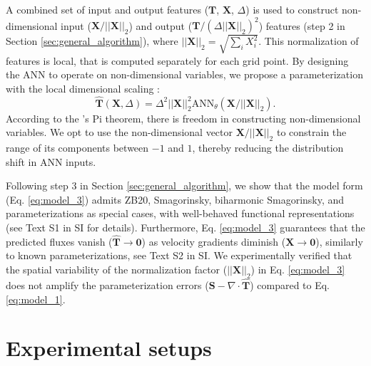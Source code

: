 \documentclass[draft]{agujournal2019}
\providecommand{\DIFadd}[1]{{\protect\color{blue}\uwave{#1}}} %
\providecommand{\DIFdel}[1]{{\protect\color{red}\sout{#1}}}                      %
\providecommand{\DIFaddbegin}{} %
\providecommand{\DIFaddend}{} %
\providecommand{\DIFdelbegin}{} %
\providecommand{\DIFdelend}{} %
\begin{document}
A combined set of input and output features ($\mathbf{T}$, $\mathbf{X}$, $\Delta$) is used to construct non-dimensional input ($\mathbf{X} / ||\mathbf{X}||_2$) and output (\DIFdelbegin \DIFdel{$\mathbf{T} / (\Delta ||\mathbf{X}||_2)^2$}\DIFdelend \DIFaddbegin \DIFadd{$\mathbf{T} / (\Delta^2 ||\mathbf{X}||_2^2)$}\DIFaddend ) features (step 2 in Section \ref{sec:general_algorithm}), where $||\mathbf{X}||_2= \sqrt{\sum_i X_i^2}$. This normalization of features is local, that is computed separately for each grid point. By designing the ANN to operate on non-dimensional variables, we propose a parameterization with the local dimensional scaling \cite{reissmann2021application, prakash2022invariant}:
\begin{equation}
    \widehat{\mathbf{T}}(\mathbf{X}, \Delta) = \Delta^2 ||\mathbf{X}||_2^2 \mathrm{ANN}_{\theta} (\mathbf{X} / ||\mathbf{X}||_2). \label{eq:model_3}
\end{equation}
According to the 's Pi theorem, there is freedom in constructing non-dimensional variables. We opt to use the non-dimensional vector $\mathbf{X} / ||\mathbf{X}||_2$ to constrain the range of its components between $-1$ and $1$, thereby reducing the distribution shift in ANN inputs. 

Following step 3 in Section \ref{sec:general_algorithm}, we show that the model form (Eq. \eqref{eq:model_3}) admits ZB20, Smagorinsky, biharmonic Smagorinsky, and  parameterizations as special cases, with well-behaved functional representations (see Text S1 in SI for details). Furthermore, Eq. \eqref{eq:model_3} guarantees that the predicted fluxes vanish ($\widehat{\mathbf{T}}\to\mathbf{0}$) as velocity gradients diminish ($\mathbf{X}\to\mathbf{0}$), similarly to known parameterizations, see Text S2 in SI. We experimentally verified that the spatial variability of the normalization factor ($||\mathbf{X}||_2$) in Eq. \eqref{eq:model_3} does not amplify the parameterization errors ($\mathbf{S}-\nabla \cdot \widehat{\mathbf{T}}$) compared to Eq. \eqref{eq:model_1}.



\section{Experimental setups}
\end{document}
